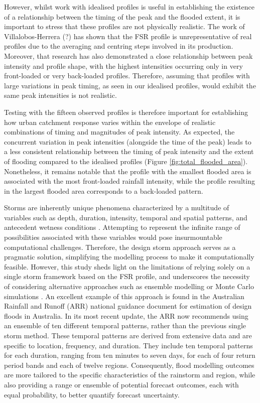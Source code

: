 \documentclass[APA,Times2COL]{WileyNJDv5}
\begin{document}
However, whilst work with idealised profiles is useful in establishing the existence of a relationship between the timing of the peak and the flooded extent, it is important to stress that these profiles are not physically realistic. The work of Villalobos-Herrera (?) has shown that the FSR profile is unrepresentative of real profiles due to the averaging and centring steps involved in its production. Moreover, that research has also demonstrated a close relationship between peak intensity and profile shape, with the highest intensities occurring only in very front-loaded or very back-loaded profiles. Therefore, assuming that profiles with large variations in peak timing, as seen in our idealised profiles, would exhibit the same peak intensities is not realistic.

Testing with the fifteen observed profiles is therefore important for establishing how urban catchment response varies within the envelope of realistic combinations of timing and magnitudes of peak intensity. As expected, the concurrent variation in peak intensities (alongside the time of the peak) leads to a less consistent relationship between the timing of peak intensity and the extent of flooding compared to the idealised profiles (Figure \ref{fig:total_flooded_area}). Nonetheless, it remains notable that the profile with the smallest flooded area is associated with the most front-loaded rainfall intensity, while the profile resulting in the largest flooded area corresponds to a back-loaded pattern.

Storms are inherently unique phenomena characterized by a multitude of variables such as depth, duration, intensity, temporal and spatial patterns, and antecedent wetness conditions \citep{loveridge2018monte}. Attempting to represent the infinite range of possibilities associated with these variables would pose insurmountable computational challenges. Therefore, the design storm approach serves as a pragmatic solution, simplifying the modelling process to make it computationally feasible. However, this study sheds light on the limitations of relying solely on a single storm framework based on the FSR profile, and underscores the necessity of considering alternative approaches such as ensemble modelling or Monte Carlo simulations \citep{nathan2003use}. An excellent example of this approach is found in the Australian Rainfall and Runoff (ARR) national guidance document for estimation of design floods in Australia. In its most recent update, the ARR now recommends using an ensemble of ten different temporal patterns, rather than the previous single storm method. These temporal patterns are derived from extensive data and are specific to location, frequency, and duration. They include ten temporal patterns for each duration, ranging from ten minutes to seven days, for each of four return period bands and each of twelve regions. Consequently, flood modelling outcomes are more tailored to the specific characteristics of the rainstorm and region, while also providing a range or ensemble of potential forecast outcomes, each with equal probability, to better quantify forecast uncertainty. 
\end{document}
